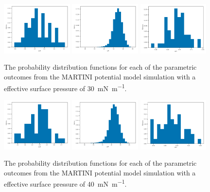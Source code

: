 \documentclass[amsmath,amssymb,superscriptaddress]{revtex4-1}
\begin{document}
%
%
\begin{figure}
 \centering
 \includegraphics[width=0.32\textwidth]{martini_30_dh}
 \includegraphics[width=0.32\textwidth]{martini_30_tt}
 \includegraphics[width=0.32\textwidth]{martini_30_wph}
 \caption{The probability distribution functions for each of the parametric outcomes from the MARTINI potential model simulation with a effective surface pressure of \SI{30}{\milli\newton\per\meter}.}
 \label{fig:ma30}
\end{figure}
%
%
\begin{figure}
 \centering
 \includegraphics[width=0.32\textwidth]{martini_40_dh}
 \includegraphics[width=0.32\textwidth]{martini_40_tt}
 \includegraphics[width=0.32\textwidth]{martini_40_wph}
 \caption{The probability distribution functions for each of the parametric outcomes from the MARTINI potential model simulation with a effective surface pressure of \SI{40}{\milli\newton\per\meter}.}
 \label{fig:ma40}
\end{figure}
\end{document}
